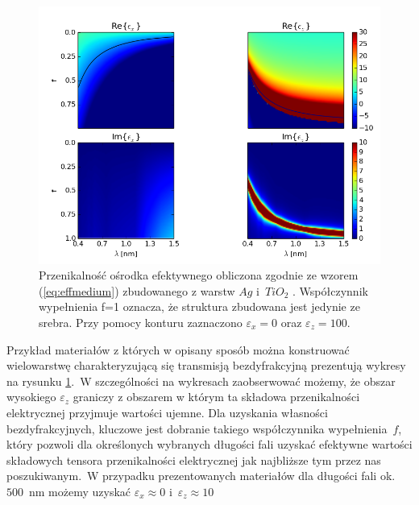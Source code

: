 \begin{figure}[tbh]
	\includegraphics[width=\textwidth]{images/multilayer/agtio2-effective.png}
	\caption{Przenikalność ośrodka efektywnego obliczona zgodnie ze wzorem (\ref{eq:effmedium})  zbudowanego z warstw $Ag$ \cite{PhysRevB.6.4370} i~$TiO_2$ \cite{DEVORE:51}. Współczynnik wypełnienia f=1 oznacza, że struktura zbudowana jest jedynie ze srebra. Przy pomocy konturu zaznaczono $\varepsilon_x=0$ oraz $\varepsilon_z=100$.}
	\label{fig:multiex}
\end{figure}

Przykład materiałów z których w opisany sposób można konstruować wielowarstwę charakteryzującą się transmisją bezdyfrakcyjną prezentują wykresy na rysunku \ref{fig:multiex}.~W szczególności na wykresach zaobserwować możemy, że obszar wysokiego $\varepsilon_z$ graniczy z obszarem w którym ta składowa przenikalności elektrycznej przyjmuje wartości ujemne. Dla uzyskania własności bezdyfrakcyjnych, kluczowe jest dobranie takiego współczynnika wypełnienia~$f$, który pozwoli dla określonych wybranych długości fali uzyskać efektywne wartości składowych tensora przenikalności elektrycznej jak najbliższe tym przez nas poszukiwanym.~W przypadku prezentowanych materiałów dla długości fali ok.~$500$~nm możemy uzyskać $\varepsilon_x \approx 0$ i~$\varepsilon_z \approx 10$







